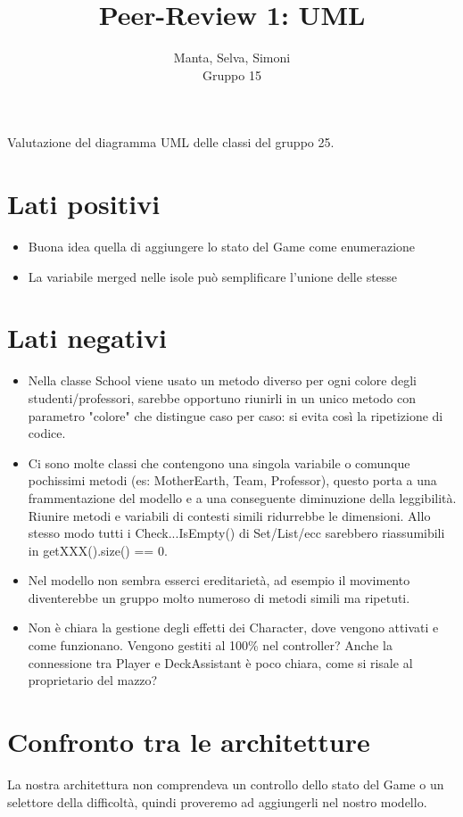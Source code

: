 \documentclass[12pt]{article}
\title{Peer-Review 1: UML}
\author{Manta, Selva, Simoni\\Gruppo 15}
\begin{document}
\maketitle

Valutazione del diagramma UML delle classi del gruppo 25.

\section{Lati positivi}

\begin{itemize}
  \item Buona idea quella di aggiungere lo stato del Game come enumerazione
  \item La variabile merged nelle isole può semplificare l'unione delle stesse
\end{itemize}

\section{Lati negativi}

\begin{itemize}
  \item Nella classe School viene usato un metodo diverso per ogni colore degli studenti/professori, sarebbe opportuno riunirli in un unico metodo con parametro "colore" che distingue caso per caso: si evita così la ripetizione di codice.
  \item Ci sono molte classi che contengono una singola variabile o comunque pochissimi metodi (es: MotherEarth, Team, Professor), questo porta a una frammentazione del modello e a una conseguente diminuzione della leggibilità. Riunire metodi e variabili di contesti simili ridurrebbe le dimensioni. Allo stesso modo tutti i Check...IsEmpty() di Set/List/ecc sarebbero riassumibili in getXXX().size() == 0.
  \item Nel modello non sembra esserci ereditarietà, ad esempio il movimento diventerebbe un gruppo molto numeroso di metodi simili ma ripetuti.
  \item Non è chiara la gestione degli effetti dei Character, dove vengono attivati e come funzionano. Vengono gestiti al 100\% nel controller? Anche la connessione tra Player e DeckAssistant è poco chiara, come si risale al proprietario del mazzo?
\end{itemize}

\section{Confronto tra le architetture}

La nostra architettura non comprendeva un controllo dello stato del Game o un selettore della difficoltà, quindi proveremo ad aggiungerli nel nostro modello.
\end{document}
